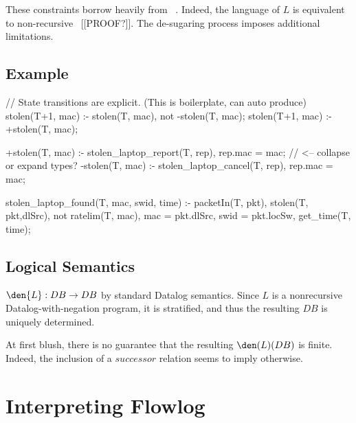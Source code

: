 \noindent These constraints borrow heavily from
\dedalus~\cite{}. Indeed, the language of $L$ is equivalent to
non-recursive \dedalus\ [[PROOF?]]. The de-sugaring process imposes
additional limitations.

\subsection{Example}

\begin{flowlog}
// State transitions are explicit. (This is boilerplate, can auto produce)
  stolen(T+1, mac) :- stolen(T, mac), not -stolen(T, mac);
  stolen(T+1, mac) :- +stolen(T, mac);

  +stolen(T, mac) :- stolen_laptop_report(T, rep), rep.mac = mac; // <-- collapse or expand types?
  -stolen(T, mac) :- stolen_laptop_cancel(T, rep), rep.mac = mac; 

stolen_laptop_found(T, mac, swid, time) :-
  packetIn(T, pkt),
  stolen(T, pkt,dlSrc), not ratelim(T, mac),
  mac = pkt.dlSrc, swid = pkt.locSw, get_time(T, time);
\end{flowlog}


\subsection{Logical Semantics}

$\den{L}: DB \rightarrow DB$ by standard Datalog semantics. Since $L$
is a nonrecursive Datalog-with-negation program, it is stratified, and
thus the resulting $DB$ is uniquely determined. 

At first blush, there is no guarantee that the resulting $\den(L)(DB)$
is finite. Indeed, the inclusion of a $successor$ relation seems to
imply otherwise. 







\section{Interpreting Flowlog}


